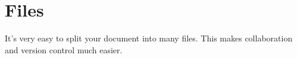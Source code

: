 \section{Files}
It's very easy to split your document into many files.  This makes
collaboration and version control much easier.
